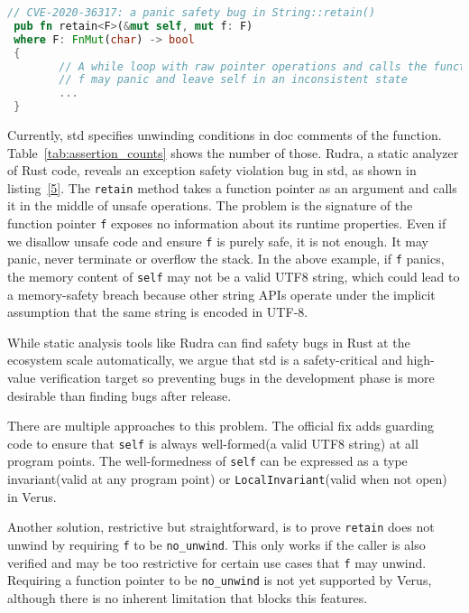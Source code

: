 \documentclass[conference]{IEEEtran}
\begin{document}
\begin{lstlisting}[language=Rust,style=colouredRust, caption={An example of exception safety violation}, label = {5}]
// CVE-2020-36317: a panic safety bug in String::retain()
 pub fn retain<F>(&mut self, mut f: F)
 where F: FnMut(char) -> bool
 {
        // A while loop with raw pointer operations and calls the function f
        // f may panic and leave self in an inconsistent state
        ...
 }
\end{lstlisting}

Currently, std specifies unwinding conditions in doc comments of the function. Table~\ref{tab:assertion_counts} shows the number of those. Rudra\cite{Rudra}, a static analyzer of Rust code, reveals an exception safety violation bug\cite{CVE-2020-36317} in std, as shown in listing~\ref{5}. The \texttt{retain} method takes a function pointer as an argument and calls it in the middle of unsafe operations. The problem is the signature of the function pointer \texttt{f} exposes no information about its runtime properties. Even if we disallow unsafe code and ensure \texttt{f} is purely safe, it is not enough. It may panic, never terminate or overflow the stack. In the above example, if \texttt{f} panics, the memory content of \texttt{self} may not be a valid UTF8 string, which could lead to a memory-safety breach because other string APIs operate under the implicit assumption that the same string is encoded in UTF‑8.  

While static analysis tools like Rudra can find safety bugs in Rust at the ecosystem scale automatically, we argue that std is a safety-critical and high-value verification target so preventing bugs in the development phase is more desirable than finding bugs after release. 

There are multiple approaches to this problem. The official fix adds guarding code to ensure that \texttt{self} is always well-formed(a valid UTF8 string) at all program points. The well-formedness of \texttt{self} can be expressed as a type invariant(valid at any program point) or \texttt{LocalInvariant}(valid when not open) in Verus. 

Another solution, restrictive but straightforward, is to prove \texttt{retain} does not unwind by requiring \texttt{f} to be \texttt{no\_unwind}. This only works if the caller is also verified and may be too restrictive for certain use cases that \texttt{f} may unwind. Requiring a function pointer to be \texttt{no\_unwind} is not yet supported by Verus, although there is no inherent limitation that blocks this features.   
\end{document}
